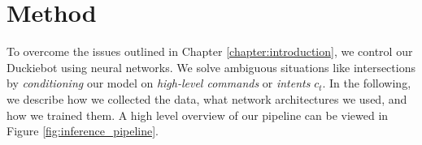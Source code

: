 \chapter{Method}
\label{chapter:method}

To overcome the issues outlined in Chapter \ref{chapter:introduction}, we control our Duckiebot using neural networks. 
We solve ambiguous situations like intersections by \textit{conditioning} our model on \textit{high-level commands} or \textit{intents} $c_t$. 
In the following, we describe how we collected the data, what network architectures we used, and how we trained them. 
A high level overview of our pipeline can be viewed in Figure \ref{fig:inference_pipeline}. 


 






